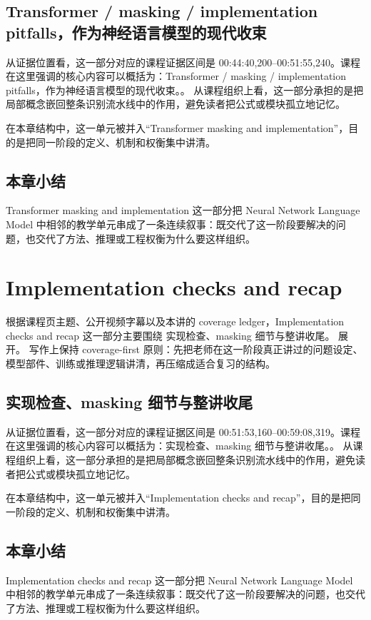 \documentclass[a4paper]{article}
\begin{document}
\subsection{Transformer / masking / implementation pitfalls，作为神经语言模型的现代收束}
从证据位置看，这一部分对应的课程证据区间是 00:44:40,200--00:51:55,240。课程在这里强调的核心内容可以概括为：Transformer / masking / implementation pitfalls，作为神经语言模型的现代收束。。
从课程组织上看，这一部分承担的是把局部概念嵌回整条识别流水线中的作用，避免读者把公式或模块孤立地记忆。

在本章结构中，这一单元被并入“Transformer masking and implementation”，目的是把同一阶段的定义、机制和权衡集中讲清。

\subsection{本章小结}
Transformer masking and implementation 这一部分把 Neural Network Language Model 中相邻的教学单元串成了一条连续叙事：既交代了这一阶段要解决的问题，也交代了方法、推理或工程权衡为什么要这样组织。

\section{Implementation checks and recap}
根据课程页主题、公开视频字幕以及本讲的 coverage ledger，Implementation checks and recap 这一部分主要围绕 实现检查、masking 细节与整讲收尾。 展开。
写作上保持 coverage-first 原则：先把老师在这一阶段真正讲过的问题设定、模型部件、训练或推理逻辑讲清，再压缩成适合复习的结构。

\subsection{实现检查、masking 细节与整讲收尾}
从证据位置看，这一部分对应的课程证据区间是 00:51:53,160--00:59:08,319。课程在这里强调的核心内容可以概括为：实现检查、masking 细节与整讲收尾。。
从课程组织上看，这一部分承担的是把局部概念嵌回整条识别流水线中的作用，避免读者把公式或模块孤立地记忆。

在本章结构中，这一单元被并入“Implementation checks and recap”，目的是把同一阶段的定义、机制和权衡集中讲清。

\subsection{本章小结}
Implementation checks and recap 这一部分把 Neural Network Language Model 中相邻的教学单元串成了一条连续叙事：既交代了这一阶段要解决的问题，也交代了方法、推理或工程权衡为什么要这样组织。
\end{document}

